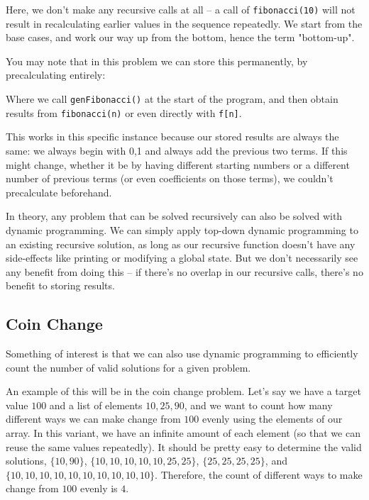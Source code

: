 Here, we don't make any recursive calls at all -- a call of \texttt{fibonacci(10)} will not result in recalculating earlier values in the sequence repeatedly. We start from the base cases, and work our way up from the bottom, hence the term "bottom-up".

You may note that in this problem we can store this permanently, by precalculating entirely:


Where we call \texttt{genFibonacci()} at the start of the program, and then obtain results from \texttt{fibonacci(n)} or even directly with \texttt{f[n]}.

This works in this specific instance because our stored results are always the same: we always begin with {0,1} and always add the previous two terms. If this might change, whether it be by having different starting numbers or a different number of previous terms (or even coefficients on those terms), we couldn't precalculate beforehand.

In theory, any problem that can be solved recursively can also be solved with dynamic programming. We can simply apply top-down dynamic programming to an existing recursive solution, as long as our recursive function doesn't have any side-effects like printing or modifying a global state. But we don't necessarily see any benefit from doing this -- if there's no overlap in our recursive calls, there's no benefit to storing results.

\subsection{Coin Change}

Something of interest is that we can also use dynamic programming to efficiently count the number of valid solutions for a given problem.

An example of this will be in the coin change problem. Let's say we have a target value $100$ and a list of elements $10,25,90$, and we want to count how many different ways we can make change from $100$ evenly using the elements of our array. In this variant, we have an infinite amount of each element (so that we can reuse the same values repeatedly). It should be pretty easy to determine the valid solutions, $\{10,90\}$, $\{10,10,10,10,10,25,25\}$, $\{25,25,25,25\}$, and $\{10,10,10,10,10,10,10,10,10,10\}$. Therefore, the count of different ways to make change from $100$ evenly is $4$.

